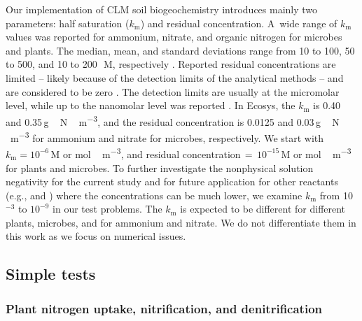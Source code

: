 \documentclass[gmd,noline]{copernicus}
\begin{document}
      Our implementation of CLM soil biogeochemistry introduces mainly two
      parameters: half saturation ($k_\mathrm{m}$) and residual
      concentration. A~wide range of $k_\mathrm{m}$ values was reported for
      ammonium, nitrate, and organic nitrogen for microbes and plants. The
      median, mean, and standard deviations range from 10 to 100, 50 to 500, and 10 to 200\,\unit{{\mu}M}, respectively
      \citep{Kuzyakov2013}. Reported residual concentrations are limited --
      likely because of the detection limits of the analytical methods --
      and are considered to be zero \cite[e.g.,][]{Hogh1997}. The detection
      limits are usually at the micromolar level, while up to the nanomolar
      level was reported \citep{Nollet2013}. In Ecosys, the $k_\mathrm{m}$ is
      0.40 and 0.35\,\unit{g\,N\,m^{-3}}, and the residual concentration is
      0.0125 and 0.03\,\unit{g\,N\,m^{-3}} \citep{Grant2013} for ammonium
      and nitrate for microbes, respectively. We start with $k_\mathrm{m}=10^{-6}$\,\unit{M} or
      \unit{mol\,m^{-3}}, and residual
      concentration\,$=$\,$10^{-15}$\,\unit{M} or \unit{mol\,m^{-3}} for
      plants and microbes. To further investigate the nonphysical solution
      negativity for the current study and for future application for other
      reactants (e.g.,  and ) where the concentrations
      can be much lower, we examine $k_\mathrm{m}$ from 10$^{-3}$ to $10^{-9}$ in our
      test problems. The $k_\mathrm{m}$ is expected to be different for
      different plants, microbes, and for ammonium and nitrate. We do not
      differentiate them in this work as we focus on numerical issues.



\subsection{Simple tests}%

\subsubsection{Plant nitrogen uptake, nitrification, and denitrification}%
\label{sec:test1}
\end{document}

